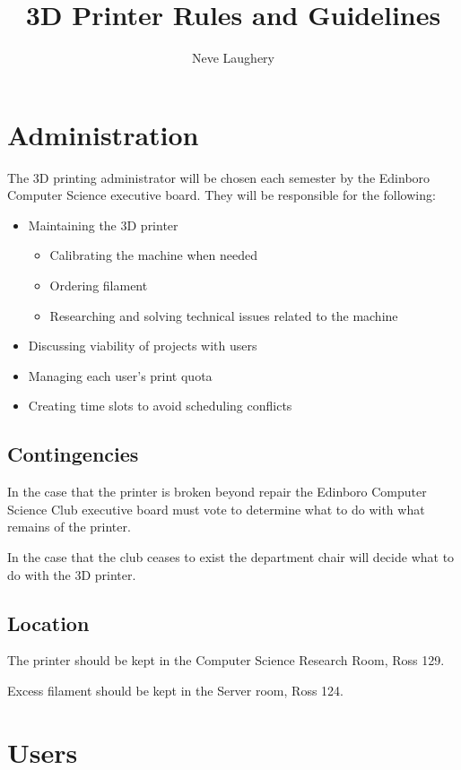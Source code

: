 \documentclass{article}
\title{3D Printer Rules and Guidelines}
\author{Neve Laughery}
\begin{document}
\maketitle

\section{Administration}

The 3D printing administrator will be chosen each semester by the Edinboro Computer Science executive board. They will be responsible for the following:

\begin{itemize}
	\item Maintaining the 3D printer
	\begin{itemize}
		\item Calibrating the machine when needed
		\item Ordering filament
		\item Researching and solving technical issues related to the machine
	\end{itemize}
	\item Discussing viability of projects with users
	\item Managing each user's print quota
	\item Creating time slots to avoid scheduling conflicts
\end{itemize}

\subsection{Contingencies}

In the case that the printer is broken beyond repair the Edinboro Computer Science Club executive board must vote to determine what to do with what remains of the printer.

In the case that the club ceases to exist the department chair will decide what to do with the 3D printer.

\subsection{Location}

The printer should be kept in the Computer Science Research Room, Ross 129.

Excess filament should be kept in the Server room, Ross 124.

\section{Users}
\end{document}
